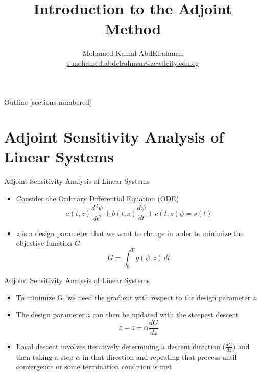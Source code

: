 \documentclass[10pt]{beamer}
\title{Introduction to the Adjoint Method}
\author{
	Mohamed Kamal AbdElrahman \\
 \href{my_email}{s-mohamed.abdelrahman@zewilcity.edu.eg}}
\institute{University of Science and Technology \\[10pt] Zewail City}
\date{}
\begin{document}
\begin{frame}
	\titlepage
\end{frame}
\begin{frame}{Outline}
	[sections numbered]
	\tableofcontents%
\end{frame}
\section{Adjoint Sensitivity Analysis of Linear Systems}
\begin{frame}{Adjoint Sensitivity Analysis of Linear Systems}
	\begin{itemize}
		\item  Consider the Ordinary Differential Equation (ODE)
		\begin{equation}
a(t,z)\frac{d^2 \psi}{dt^2} + b(t,z)\frac{d \psi}{dt} +c(t,z) \psi = s(t) 
		\end{equation}
\item $z$ is a design parameter that we want to change in order to minimize the objective function $G$
\begin{equation}
G = \int^{T}_0  g(\psi,z) \, dt
\end{equation}
	\end{itemize}
\end{frame}

\begin{frame}{Adjoint Sensitivity Analysis of Linear Systems}
	\begin{itemize}
	\item  To minimize G, we  need the gradient with respect to the design parameter $z$.
	
	\item The  design parameter $z$ can then be updated with the steepest descent 
	\begin{equation}
	z = z - \alpha \frac{dG}{dz}
	\end{equation}
	
	\item Local descent involves iteratively determining a descent direction ($ \frac{dG}{dz}$) and	then taking a step $\alpha$ in that direction and repeating that process until convergence or some termination condition is met
	\end{itemize}
\end{frame}
\end{document}
